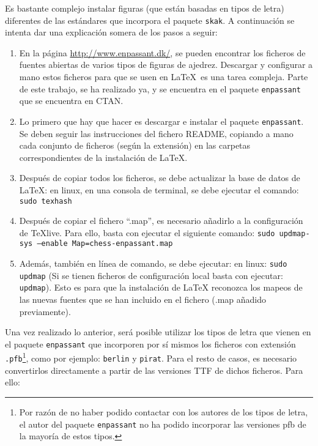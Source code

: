 \documentclass[a4paper,10pt, twocolumn]{article}
\newcommand{\mi}[1]{\texttt{#1}} %
\begin{document}
    Es bastante complejo instalar figuras (que están basadas en tipos de letra) diferentes de las estándares que incorpora el paquete {\tt skak}. A continuación se intenta dar una explicación somera de los pasos a seguir:
    
    \begin{enumerate}
        \item En la página \href{http://www.enpassant.dk/}{http://www.enpassant.dk/}, se pueden encontrar los ficheros de fuentes abiertas de varios tipos de figuras de ajedrez. Descargar y configurar a mano estos ficheros para que se usen en \LaTeX\ es una tarea compleja. Parte de este trabajo, se ha realizado ya, y se encuentra en el paquete {\tt enpassant} que se encuentra en CTAN.
        \item Lo primero que hay que hacer es descargar e instalar el paquete {\tt enpassant}. Se deben seguir las instrucciones del fichero README, copiando a mano cada conjunto de ficheros (según la extensión) en las carpetas correspondientes de la instalación de LaTeX.
        \item Después de copiar todos los ficheros, se debe actualizar la base de datos de LaTeX: en linux, en una consola de terminal, se debe ejecutar el comando: \mi{sudo texhash}
        \item Después de copiar el fichero “.map”, es necesario añadirlo a la configuración de TeXlive. Para ello, basta con ejecutar el siguiente comando: {\scriptsize \mi{sudo updmap-sys --enable Map=chess-enpassant.map}}
        \item Además, también en línea de comando, se debe ejecutar: en linux: \mi{sudo updmap} (Si se tienen ficheros de configuración local basta con ejecutar: \mi{updmap}). Esto es para que la instalación de LaTeX reconozca los mapeos de las nuevas fuentes que se han incluido en el fichero (.map añadido previamente).
    \end{enumerate} 
       
    Una vez realizado lo anterior, será posible utilizar los tipos de letra que vienen en el paquete {\tt enpassant} que incorporen por sí mismos los ficheros con extensión {\tt .pfb}\footnote{Por razón de no haber podido contactar con los autores de los tipos de letra, el autor del paquete {\tt enpassant} no ha podido incorporar las versiones pfb de la mayoría de estos tipos.}, como por ejemplo: {\tt berlin} y {\tt pirat}. Para el resto de casos, es necesario convertirlos directamente a partir de las versiones TTF de dichos ficheros. Para ello:
    
\end{document}
